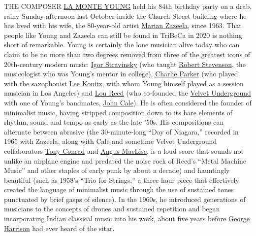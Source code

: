THE COMPOSER
\href{https://www.nytimes.com/2015/08/23/arts/music/la-monte-young-is-still-patiently-working-on-a-glacial-scale.html}{LA
MONTE YOUNG} held his 84th birthday party on a drab, rainy Sunday
afternoon last October inside the Church Street building where he has
lived with his wife, the 80-year-old artist
\href{https://www.nytimes.com/2015/04/03/arts/design/young-and-zazeelas-dream-house-is-getting-a-new-lease-at-dia.html}{Marian
Zazeela}, since 1963. That people like Young and Zazeela can still be
found in TriBeCa in 2020 is nothing short of remarkable. Young is
certainly the lone musician alive today who can claim to be no more than
two degrees removed from three of the greatest icons of 20th-century
modern music:
\href{https://www.nytimes.com/topic/person/igor-stravinsky}{Igor
Stravinsky} (who taught
\href{https://newsroom.ucla.edu/faculty-bulletin-board/in-memoriam--leading-music-scholar-robert-m--stevenson}{Robert
Stevenson}, the musicologist who was Young's mentor in college),
\href{https://www.nytimes.com/topic/person/charlie-parker}{Charlie
Parker} (who played with the saxophonist
\href{https://www.nytimes.com/2020/04/16/arts/music/lee-konitz-dead-coronavirus.html}{Lee
Konitz}, with whom Young himself played as a session musician in Los
Angeles) and \href{https://www.nytimes.com/topic/person/lou-reed}{Lou
Reed} (who co-founded the
\href{https://www.nytimes.com/topic/organization/the-velvet-underground}{Velvet
Underground} with one of Young's bandmates,
\href{https://www.nytimes.com/2018/10/11/arts/music/velvet-underground-experience-john-cale.html}{John
Cale}). He is often considered the founder of minimalist music, having
stripped composition down to its bare elements of rhythm, sound and
tempo as early as the late '50s. His compositions can alternate between
abrasive (the 30-minute-long ``Day of Niagara,'' recorded in 1965 with
Zazeela, along with Cale and sometime Velvet Underground collaborators
\href{https://www.nytimes.com/2016/04/10/arts/artsspecial/tony-conrad-experimental-filmmaker-and-musician-dies-at-76.html}{Tony
Conrad} and
\href{https://www.nytimes.com/2011/05/06/arts/music/angus-maclise-of-velvet-underground-in-dreamweapon.html}{Angus
MacLise}, is a loud score that sounds not unlike an airplane engine and
predated the noise rock of Reed's ``Metal Machine Music'' and other
staples of early punk by about a decade) and hauntingly beautiful (such
as 1958's ``Trio for Strings,'' a three-hour piece that effectively
created the language of minimalist music through the use of sustained
tones punctuated by brief gasps of silence). In the 1960s, he introduced
generations of musicians to the concepts of drones and sustained
repetition and began incorporating Indian classical music into his work,
about five years before
\href{https://www.nytimes.com/2001/12/01/arts/george-harrison-quiet-beatle-and-lead-guitarist-dies-at-58.html}{George
Harrison} had ever heard of the sitar.

